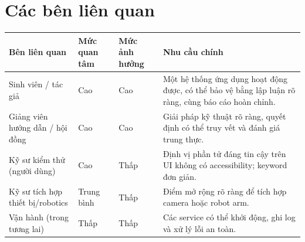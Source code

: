 \documentclass[11pt,a4paper]{report}
\begin{document}
\section{Các bên liên quan}
\begin{longtable}{@{}p{3.4cm}p{2.2cm}p{2.0cm}p{6.0cm}@{}}
\toprule
\textbf{Bên liên quan} & \textbf{Mức quan tâm} & \textbf{Mức ảnh hưởng} & \textbf{Nhu cầu chính} \\
\midrule
\endhead
Sinh viên / tác giả & Cao & Cao & Một hệ thống ứng dụng hoạt động được, có thể bảo vệ bằng lập luận rõ ràng, cùng báo cáo hoàn chỉnh. \\
Giảng viên hướng dẫn / hội đồng & Cao & Cao & Giải pháp kỹ thuật rõ ràng, quyết định có thể truy vết và đánh giá trung thực. \\
Kỹ sư kiểm thử (người dùng) & Cao & Thấp & Định vị phần tử đáng tin cậy trên UI không có accessibility; keyword đơn giản. \\
Kỹ sư tích hợp thiết bị/robotics & Trung bình & Thấp & Điểm mở rộng rõ ràng để tích hợp camera hoặc robot arm. \\
Vận hành (trong tương lai) & Thấp & Thấp & Các service có thể khởi động, ghi log và xử lý lỗi an toàn. \\
\bottomrule
\end{longtable}

\end{document}

